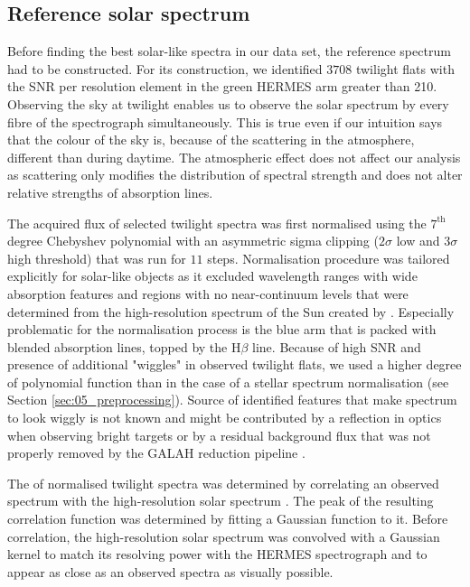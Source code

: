 \subsection{Reference solar spectrum}
\label{sec:05_reference}
Before finding the best solar-like spectra in our data set, the reference spectrum had to be constructed. For its construction, we identified $3708$ twilight flats with the SNR per resolution element in the green HERMES arm greater than 210. Observing the sky at twilight enables us to observe the solar spectrum by every fibre of the spectrograph simultaneously. This is true even if our intuition says that the colour of the sky is, because of the scattering in the atmosphere, different than during daytime. The atmospheric effect does not affect our analysis as scattering only modifies the distribution of spectral strength and does not alter relative strengths of absorption lines.

The acquired flux of selected twilight spectra was first normalised using the $7^\text{th}$ degree Chebyshev polynomial with an asymmetric sigma clipping ($2\sigma$ low and $3\sigma$ high threshold) that was run for $11$ steps. Normalisation procedure was tailored explicitly for solar-like objects as it excluded wavelength ranges with wide absorption features and regions with no near-continuum levels that were determined from the high-resolution spectrum of the Sun created by \citet{2005MSAIS...8..189K}. Especially problematic for the normalisation process is the blue arm that is packed with blended absorption lines, topped by the H$\beta$ line. Because of high SNR and presence of additional "wiggles" in observed twilight flats, we used a higher degree of polynomial function than in the case of a stellar spectrum normalisation (see Section \ref{sec:05_preprocessing}). Source of identified features that make spectrum to look wiggly is not known and might be contributed by a reflection in optics when observing bright targets or by a residual background flux that was not properly removed by the GALAH reduction pipeline \cite{2017MNRAS.464.1259K}.

The  of normalised twilight spectra was determined by correlating an observed spectrum with the high-resolution solar spectrum \cite{2005MSAIS...8..189K}. The peak of the resulting correlation function was determined by fitting a Gaussian function to it. Before correlation, the high-resolution solar spectrum was convolved with a Gaussian kernel to match its resolving power with the HERMES spectrograph and to appear as close as an observed spectra as visually possible. 

